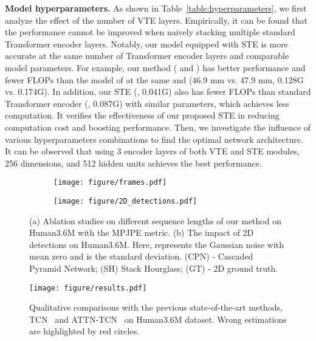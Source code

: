 \documentclass[journal]{IEEEtran}
\begin{document}
\textbf{Model hyperparameters.}
As shown in Table~\ref{table:hyperparameters}, we first analyze the effect of the number of VTE layers. 
Empirically, it can be found that the performance cannot be improved when naively stacking multiple standard Transformer encoder layers. 
Notably, our model equipped with STE is more accurate at the same number of Transformer encoder layers and comparable model parameters. 
For example, our method ( and ) has better performance and fewer FLOPs than the model of  at the same  and  (46.9 mm vs. 47.9 mm, 0.128G vs. 0.174G). 
In addition, our STE (, 0.041G) also has fewer FLOPs than standard Transformer encoder (, 0.087G) with similar parameters, which achieves  less computation. 
It verifies the effectiveness of our proposed STE in reducing computation cost and boosting performance. 
Then, we investigate the influence of various hyperparameters combinations to find the optimal network architecture. 
It can be observed that using 3 encoder layers of both VTE and STE modules, 256 dimensions, and 512 hidden units achieves the best performance. 

\begin{figure}[tb]
   \centering
   \begin{subfigure}[htb]{0.241\textwidth}
      \texttt{[image: figure/frames.pdf]}
      \caption{}
      \label{fig:frames}
   \end{subfigure}
   \begin{subfigure}[htb]{0.241\textwidth}
      \texttt{[image: figure/2D\_detections.pdf]}
      \caption{}
      \label{fig:2D_detections}
   \end{subfigure}
   \caption
   {
      (a) Ablation studies on different sequence lengths of our method on Human3.6M with the MPJPE metric. 
      (b) The impact of 2D detections on Human3.6M. 
      Here,  represents the Gaussian noise with mean zero and  is the standard deviation. 
      (CPN) - Cascaded Pyramid Network; (SH) Stack Hourglass; (GT) - 2D ground truth.  
   }
   \label{fig:frames and 2D}
\end{figure}

\begin{figure*}[htb]
   \centering
   \texttt{[image: figure/results.pdf]}
   \caption
   {
      Qualitative comparisons with the previous state-of-the-art methods, TCN~\cite{pavllo20193d} and ATTN-TCN~\cite{liu2020attention} on Human3.6M dataset. 
      Wrong estimations are highlighted by red circles. 
   }
   \label{fig:results}
\end{figure*}
\end{document}
